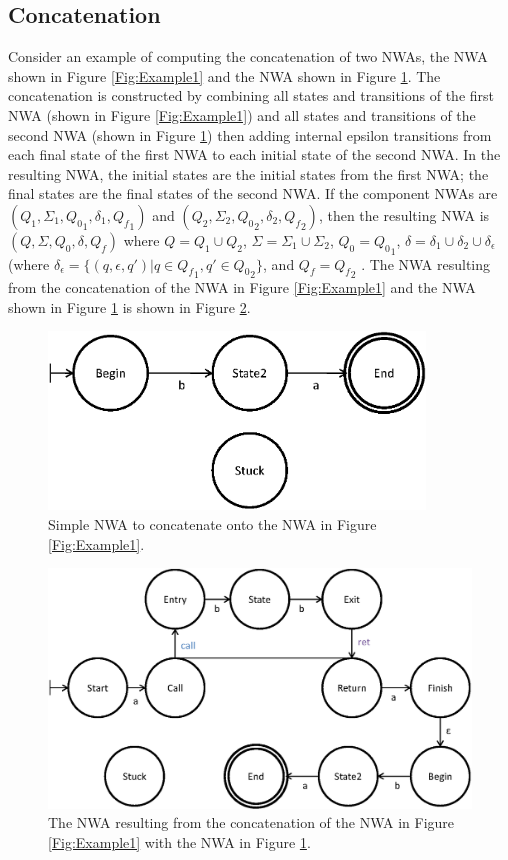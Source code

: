 \documentclass{llncs}
\begin{document}
\subsection{Concatenation}
\label{Se:Concatenation}

Consider an example of computing the concatenation of two NWAs, the NWA shown in Figure \ref{Fig:Example1} and the NWA shown in Figure \ref{Fig:Concat1}.  The concatenation is constructed by combining all states and transitions of the first NWA (shown in Figure \ref{Fig:Example1}) and all states and transitions of the second NWA (shown in Figure \ref{Fig:Concat1}) then adding internal epsilon transitions from each final state of the first NWA to each initial state of the second NWA.  In the resulting NWA, the initial states are the initial states from the first NWA; the final states are the final states of the second NWA.  If the component NWAs are  $(Q_1, \Sigma_1, {Q_0}_1, \delta_1, {Q_f}_1)$ and $(Q_2, \Sigma_2, {Q_0}_2, \delta_2, {Q_f}_2)$, then the resulting NWA is $(Q, \Sigma, Q_0, \delta, Q_f)$ where $Q = Q_1 \cup Q_2$, $\Sigma = \Sigma_1 \cup \Sigma_2$, $Q_0 = {Q_0}_1$, $\delta = \delta_1 \cup \delta_2 \cup \delta_\epsilon$ (where $\delta_\epsilon = \{(q,\epsilon,q') | q \in {Q_f}_1, q' \in {Q_0}_2\}$, and $Q_f = {Q_f}_2$ .  The NWA resulting from the concatenation of the NWA in Figure \ref{Fig:Example1} and the NWA shown in Figure \ref{Fig:Concat1} is shown in Figure \ref{Fig:Concat2}.

\begin{figure}[p]
  \centering
    \includegraphics[width=10cm]{Figures/Figure9.eps}
  \caption{Simple NWA to concatenate onto the NWA in Figure \ref{Fig:Example1}.}
  \label{Fig:Concat1}
\end{figure}

\begin{figure}[p]
  \centering
    \includegraphics[width=12cm]{Figures/Figure10.eps}
  \caption{The NWA resulting from the concatenation of the NWA in Figure \ref{Fig:Example1} with the NWA in Figure \ref{Fig:Concat1}.}
  \label{Fig:Concat2}
\end{figure}
\end{document}
